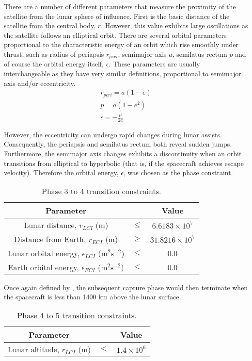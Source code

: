There are a number of different parameters that measure the proximity of the satellite from the lunar sphere of influence. First is the basic distance of the satellite from the central body, $r$. However, this value exhibits large oscillations as the satellite follows an elliptical orbit. There are several orbital parameters proportional to the characteristic energy of an orbit which rise smoothly under thrust, such as radius of periapsis $r_{peri}$, semimajor axis $a$, semilatus rectum $p$ and of course the orbital energy itself, $\epsilon$. These parameters are usually interchangeable as they have very similar definitions, proportional to semimajor axis and/or eccentricity.
\begin{gather}
r_{peri} = a(1-e)\\
p = a(1-e^2)\\
\epsilon = -\frac{\mu}{2a}
\end{gather}

However, the eccentricity can undergo rapid changes during lunar assists. Consequently, the periapsis and semilatus rectum both reveal sudden jumps. Furthermore, the semimajor axis changes exhibits a discontinuity when an orbit transitions from elliptical to hyperbolic (that is, if the spacecraft achieves escape velocity). Therefore the orbital energy, $\epsilon$, was chosen as the phase constraint.

\begin{table}[h]
\caption{Phase 3 to 4 transition constraints.} \label{tab:Phase-3-4-constraints}
\centering
\begin{tabular} {ccc}\toprule
Parameter & & Value\\\midrule
Lunar distance, $r_{LCI}$ (m) &$\le$& $6.6183\times 10^7$\\\midrule
Distance from Earth, $r_{ECI}$ (m) &$\ge$& $31.8216\times 10^7$\\\midrule
Lunar orbital energy, $\epsilon_{LCI}$ (m$^2$s$^{-2}$) &$\le$& 0.0 \\\midrule
Earth orbital energy, $\epsilon_{ECI}$ (m$^2$s$^{-2}$) &$\le$& 0.0 \\\bottomrule
\end{tabular}
\end{table}

Once again defined by \citeauthor{Roeser2006}, the subsequent capture phase would then terminate when the spacecraft is less than 1400 km above the lunar surface.

\begin{table}[h]
\caption{Phase 4 to 5 transition constraints.} \label{tab:Phase-4-5-constraints}
\centering
\begin{tabular} {ccc}\toprule
Parameter && Value\\\midrule
Lunar altitude, $r_{LCI}$ (m) &$\le$& $1.4\times 10^6$\\\bottomrule
\end{tabular}
\end{table}


